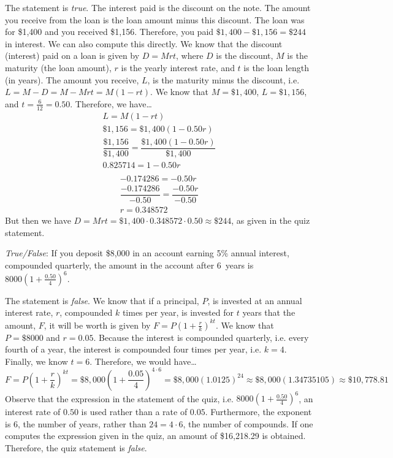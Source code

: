 \documentclass[11pt,letterpaper]{article}
\begin{document}
\sol The statement is \textit{true}. The interest paid is the discount on the note. The amount you receive from the loan is the loan amount minus this discount. The loan was for \$1,400 and you received \$1,156. Therefore, you paid $\$1,\!400 - \$1,\!156= \$244$ in interest. We can also compute this directly. We know that the discount (interest) paid on a loan is given by $D= Mrt$, where $D$ is the discount, $M$ is the maturity (the loan amount), $r$ is the yearly interest rate, and $t$ is the loan length (in years). The amount you receive, $L$, is the maturity minus the discount, i.e. $L= M - D= M - Mrt= M( 1 - rt)$. We know that $M= \$1,\!400$, $L= \$1,\!156$, and $t= \frac{6}{12}= 0.50$. Therefore, we have\dots
	\[
	\begin{gathered}
	L= M(1 - rt) \\[0.3cm]
	\$1,\!156= \$1,\!400 (1 - 0.50r) \\[0.3cm]
	\dfrac{\$1,\!156}{\$1,\!400}= \dfrac{\$1,\!400 (1 - 0.50r)}{\$1,\!400} \\[0.3cm]
	0.825714= 1 - 0.50 r \\[0.3cm]
	\end{gathered}
	\]
	\[
	\begin{gathered}
	-0.174286= -0.50 r \\[0.3cm]
	\dfrac{-0.174286}{-0.50}= \dfrac{-0.50 r}{-0.50} \\[0.3cm]
	r= 0.348572
	\end{gathered}
	\]
But then we have $D= Mrt= \$1,\!400 \cdot 0.348572 \cdot 0.50 \approx \$244$, as given in the quiz statement. \pvspace{1.3cm}



\quizsol \textit{True/False}: If you deposit \$8,000 in an account earning 5\% annual interest, compounded quarterly, the amount in the account after 6~years is $8000 \left(1 + \frac{0.50}{4} \right)^6$. \pspace

\sol The statement is \textit{false}. We know that if a principal, $P$, is invested at an annual interest rate, $r$, compounded $k$ times per year, is invested for $t$ years that the amount, $F$, it will be worth is given by $F= P \left(1 + \frac{r}{k} \right)^{kt}$. We know that $P= \$8000$ and $r= 0.05$. Because the interest is compounded quarterly, i.e. every fourth of a year, the interest is compounded four times per year, i.e. $k= 4$. Finally, we know $t= 6$. Therefore, we would have\dots
	\[
	F= P \left(1 + \frac{r}{k} \right)^{kt}= \$8,\!000 \left(1 + \frac{0.05}{4} \right)^{4 \cdot 6}= \$8,\!000 (1.0125)^{24} \approx \$8,\!000 (1.34735105) \approx \$10,\!778.81	
	\]
Observe that the expression in the statement of the quiz, i.e. $8000 \left(1 + \frac{0.50}{4} \right)^6$, an interest rate of $0.50$ is used rather than a rate of $0.05$. Furthermore, the exponent is 6, the number of years, rather than $24= 4 \cdot 6$, the number of compounds. If one computes the expression given in the quiz, an amount of \$16,218.29 is obtained. Therefore, the quiz statement is \textit{false}. \pvspace{1.1cm}
\end{document}
